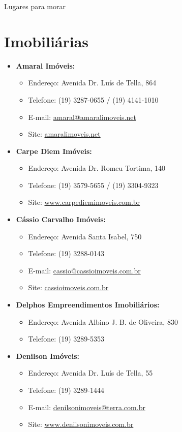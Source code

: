 \begin{story}{Lugares para morar}
\section*{Imobiliárias}

\begin{itemize}

\item \textbf{Amaral Imóveis:}
\begin{itemize}
\item Endereço: Avenida Dr. Luís de Tella, 864
\item Telefone: (19) 3287-0655 / (19) 4141-1010
\item E-mail: \url{amaral@amaralimoveis.net}
\item Site: \url{amaralimoveis.net}
\end{itemize}

\item \textbf{Carpe Diem Imóveis:}
\begin{itemize}
\item Endereço: Avenida Dr. Romeu Tortima, 140
\item Telefone: (19) 3579-5655 / (19) 3304-9323
\item Site: \url{www.carpediemimoveis.com.br}
\end{itemize}

\item \textbf{Cássio Carvalho Imóveis:}
\begin{itemize}
\item Endereço: Avenida Santa Isabel, 750
\item Telefone: (19) 3288-0143
\item E-mail: \url{cassio@cassioimoveis.com.br}
\item Site: \url{cassioimoveis.com.br}
\end{itemize}

\item \textbf{Delphos Empreendimentos Imobiliários:}
\begin{itemize}
\item Endereço: Avenida Albino J. B. de Oliveira, 830
\item Telefone: (19) 3289-5353
\end{itemize}

\item \textbf{Denilson Imóveis:}
\begin{itemize}
\item Endereço: Avenida Dr. Luís de Tella, 55
\item Telefone: (19) 3289-1444
\item E-mail: \url{denilsonimoveis@terra.com.br}
\item Site: \url{www.denilsonimoveis.com.br}
\end{itemize}


\end{itemize}
\end{story}
